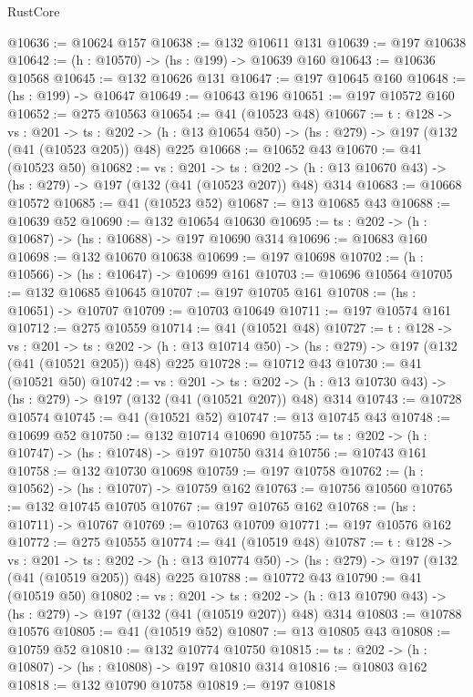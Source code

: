 \begin{lexlean}{RustCore}
\begin{coremodule}
@10636 := @10624 @157
@10638 := @132 @10611 @131
@10639 := @197 @10638
@10642 := (h : @10570) -> (hs : @199) -> @10639 @160
@10643 := @10636 @10568
@10645 := @132 @10626 @131
@10647 := @197 @10645 @160
@10648 := (hs : @199) -> @10647
@10649 := @10643 @196
@10651 := @197 @10572 @160
@10652 := @275 @10563
@10654 := @41 (@10523 @48)
@10667 := {t : @128} ->
  {vs : @201} ->
  {ts : @202} -> (h : @13 @10654 @50) -> (hs : @279) -> @197 (@132 (@41 (@10523 @205)) @48) @225
@10668 := @10652 @43
@10670 := @41 (@10523 @50)
@10682 := {vs : @201} ->
  {ts : @202} -> (h : @13 @10670 @43) -> (hs : @279) -> @197 (@132 (@41 (@10523 @207)) @48) @314
@10683 := @10668 @10572
@10685 := @41 (@10523 @52)
@10687 := @13 @10685 @43
@10688 := @10639 @52
@10690 := @132 @10654 @10630
@10695 := {ts : @202} -> (h : @10687) -> (hs : @10688) -> @197 @10690 @314
@10696 := @10683 @160
@10698 := @132 @10670 @10638
@10699 := @197 @10698
@10702 := (h : @10566) -> (hs : @10647) -> @10699 @161
@10703 := @10696 @10564
@10705 := @132 @10685 @10645
@10707 := @197 @10705 @161
@10708 := (hs : @10651) -> @10707
@10709 := @10703 @10649
@10711 := @197 @10574 @161
@10712 := @275 @10559
@10714 := @41 (@10521 @48)
@10727 := {t : @128} ->
  {vs : @201} ->
  {ts : @202} -> (h : @13 @10714 @50) -> (hs : @279) -> @197 (@132 (@41 (@10521 @205)) @48) @225
@10728 := @10712 @43
@10730 := @41 (@10521 @50)
@10742 := {vs : @201} ->
  {ts : @202} -> (h : @13 @10730 @43) -> (hs : @279) -> @197 (@132 (@41 (@10521 @207)) @48) @314
@10743 := @10728 @10574
@10745 := @41 (@10521 @52)
@10747 := @13 @10745 @43
@10748 := @10699 @52
@10750 := @132 @10714 @10690
@10755 := {ts : @202} -> (h : @10747) -> (hs : @10748) -> @197 @10750 @314
@10756 := @10743 @161
@10758 := @132 @10730 @10698
@10759 := @197 @10758
@10762 := (h : @10562) -> (hs : @10707) -> @10759 @162
@10763 := @10756 @10560
@10765 := @132 @10745 @10705
@10767 := @197 @10765 @162
@10768 := (hs : @10711) -> @10767
@10769 := @10763 @10709
@10771 := @197 @10576 @162
@10772 := @275 @10555
@10774 := @41 (@10519 @48)
@10787 := {t : @128} ->
  {vs : @201} ->
  {ts : @202} -> (h : @13 @10774 @50) -> (hs : @279) -> @197 (@132 (@41 (@10519 @205)) @48) @225
@10788 := @10772 @43
@10790 := @41 (@10519 @50)
@10802 := {vs : @201} ->
  {ts : @202} -> (h : @13 @10790 @43) -> (hs : @279) -> @197 (@132 (@41 (@10519 @207)) @48) @314
@10803 := @10788 @10576
@10805 := @41 (@10519 @52)
@10807 := @13 @10805 @43
@10808 := @10759 @52
@10810 := @132 @10774 @10750
@10815 := {ts : @202} -> (h : @10807) -> (hs : @10808) -> @197 @10810 @314
@10816 := @10803 @162
@10818 := @132 @10790 @10758
@10819 := @197 @10818

\end{coremodule}
\end{lexlean}
